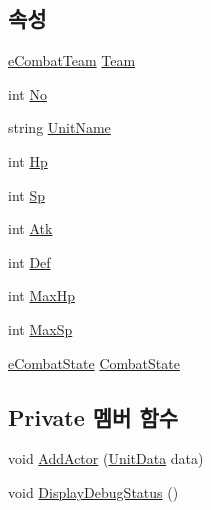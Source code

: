 \subsection*{속성}
\begin{DoxyCompactItemize}
\item 
\hyperlink{_unit_object_8cs_a833537ff3bed216464ac08315287fb12}{e\+Combat\+Team} \hyperlink{class_unit_object_ab856bbbecf4207710302fc1ecaa75379}{Team}
\item 
int \hyperlink{class_unit_object_a87d41a2fa19b25157d5d33dd883572a1}{No}
\item 
string \hyperlink{class_unit_object_ad60ea173f3e24fcdd247cd0438438858}{Unit\+Name}
\item 
int \hyperlink{class_unit_object_a07153bf66bf9922005e9421629d3b697}{Hp}
\item 
int \hyperlink{class_unit_object_a59a8969cb22dea7f58579517826974dd}{Sp}
\item 
int \hyperlink{class_unit_object_a39c41a2a1ba683b02a265594abad9684}{Atk}
\item 
int \hyperlink{class_unit_object_a35b9e7e361b6757ea62ae961fc638cd9}{Def}
\item 
int \hyperlink{class_unit_object_a1d15c3814aaa733055fae8235c45def7}{Max\+Hp}
\item 
int \hyperlink{class_unit_object_a484552912394874ea5cb91ea567b6cd4}{Max\+Sp}
\item 
\hyperlink{_unit_object_8cs_ae6d9f4a8ae9fffcdf1a546168a44f917}{e\+Combat\+State} \hyperlink{class_unit_object_a2e807fb19c32a7d2bd16d86297e7a7fa}{Combat\+State}
\end{DoxyCompactItemize}
\subsection*{Private 멤버 함수}
\begin{DoxyCompactItemize}
\item 
void \hyperlink{class_unit_object_a210d5044920f051fe347d0c5137aaae8}{Add\+Actor} (\hyperlink{class_unit_data}{Unit\+Data} data)
\item 
void \hyperlink{class_unit_object_afc26392bbc6cfaa93cc84c182a62a5d7}{Display\+Debug\+Status} ()
\end{DoxyCompactItemize}
